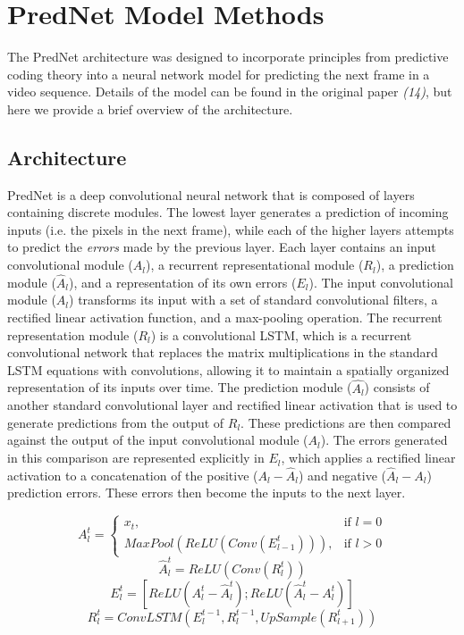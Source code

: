 \documentclass[12pt,twoside]{article}
\newif\myifpdf
\begin{document}
\section{PredNet Model Methods}

The PredNet architecture was designed to incorporate principles from predictive coding theory into a neural network model for predicting the next frame in a video sequence. Details of the model can be found in the original paper %
{\em (14)}, but here we provide a brief overview of the architecture. 

\subsection{Architecture}

PredNet is a deep convolutional neural network that is composed of layers containing discrete modules. The lowest layer generates a prediction of incoming inputs (i.e. the pixels in the next frame), while each of the higher layers attempts to predict the {\em errors} made by the previous layer. Each layer contains an input convolutional module ($A_l$), a recurrent representational module ($R_l$), a prediction module ($\hat{A}_l$), and a representation of its own errors ($E_l$). The input convolutional module ($A_l$) transforms its input with a set of standard convolutional filters, a rectified linear activation function, and a max-pooling operation. The recurrent representation module ($R_l$) is a convolutional LSTM, which is a recurrent convolutional network that replaces the matrix multiplications in the standard LSTM equations with convolutions, allowing it to maintain a spatially organized representation of its inputs over time. The prediction module ($\hat{A_l}$) consists of another standard convolutional layer and rectified linear activation that is used to generate predictions from the output of $R_l$. These predictions are then compared against the output of the input convolutional module ($A_l$). The errors generated in this comparison are represented explicitly in $E_l$, which applies a rectified linear activation to a concatenation of the positive ($A_l - \hat{A}_l$) and negative ($\hat{A}_l - A_l$) prediction errors. These errors then become the inputs to the next layer. 

\begin{equation}
A_l^t = 
\begin{cases}
    x_t, & \text{if } l = 0\\
    MaxPool(ReLU(Conv(E_{l-1}^t))), & \text{if } l > 0
\end{cases}
\end{equation}
\begin{equation}
\hat{A}_l^t = ReLU(Conv(R_l^t))
\end{equation}
\begin{equation}
E_l^t = [ReLU(A_l^t - \hat{A}_l^t); ReLU(\hat{A}_l^t - A_l^t)]
\end{equation}
\begin{equation}
R_l^t = ConvLSTM(E_l^{t-1},R_l^{t-1},UpSample(R_{l+1}^t))
\end{equation}
\end{document}
